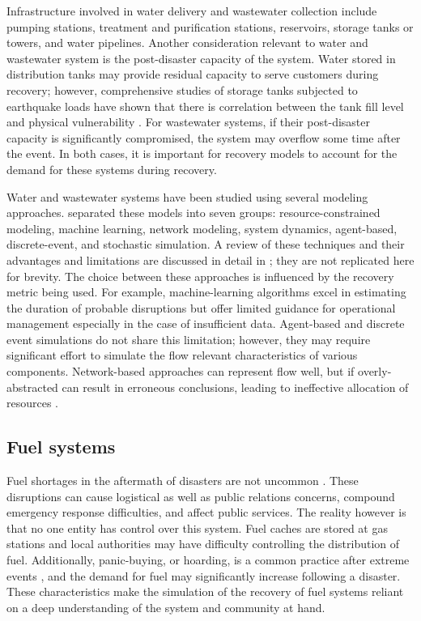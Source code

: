 Infrastructure involved in water delivery and wastewater collection include pumping stations, treatment and purification stations, reservoirs, storage tanks or towers, and water pipelines. Another consideration relevant to water and wastewater system is the post-disaster capacity of the system. Water stored in distribution tanks may provide residual capacity to serve customers during recovery; however, comprehensive studies of storage tanks subjected to earthquake loads have shown that there is correlation between the tank fill level and physical vulnerability \citep{orourke2000seismic, eidinger2012recent, cooper1997study}. For wastewater systems, if their post-disaster capacity is significantly compromised, the system may overflow some time after the event. In both cases, it is important for recovery models to account for the demand for these systems during recovery.\

Water and wastewater systems have been studied using several modeling approaches. \citet{miles2019community} separated these models into seven groups: resource-constrained modeling, machine learning, network modeling, system dynamics, agent-based, discrete-event, and stochastic simulation. A review of these techniques and their advantages and limitations are discussed in detail in \citet{miles2019community}; they are not replicated here for brevity. The choice between these approaches is influenced by the recovery metric being used. For example, machine-learning algorithms excel in estimating the duration of probable disruptions but offer limited guidance for operational management especially in the case of insufficient data. Agent-based and discrete event simulations do not share this limitation; however, they may require significant effort to simulate the flow relevant characteristics of various components. Network-based approaches can represent flow well, but if overly-abstracted can result in erroneous conclusions, leading to ineffective allocation of resources \citep{Hines2010a}. \

\subsection{Fuel systems}
Fuel shortages in the aftermath of disasters are not uncommon \citep{Smythe2013, Holguin-Veras2014}. These disruptions can cause logistical as well as public relations concerns, compound emergency response difficulties, and affect public services. The reality however is that no one entity has control over this system. Fuel caches are stored at gas stations and local authorities may have difficulty controlling the distribution of fuel. Additionally, panic-buying, or hoarding, is a common practice after extreme events \citep{shen2017development, helbing2006disasters}, and the demand for fuel may significantly increase following a disaster. These characteristics make the simulation of the recovery of fuel systems reliant on a deep understanding of the system and community at hand. \


